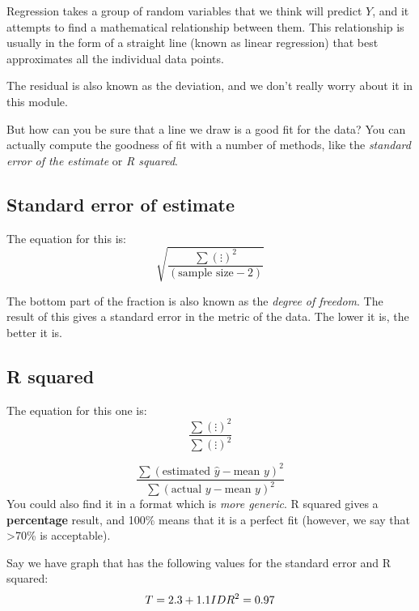 \documentclass[11pt,a4paper,titlepage]{scrartcl}
\begin{document}
Regression takes a group of random variables that we think will predict
$Y$, and it attempts to find a mathematical relationship between them.
This relationship is usually in the form of a straight line (known as
linear regression) that best approximates all the individual data points.

The residual is also known as the deviation, and we don't really worry
about it in this module.

But how can you be sure that a line we draw is a good fit for the data?
You can actually compute the goodness of fit with a number of methods,
like the \textit{standard error of the estimate} or \textit{R squared}.

\subsection{Standard error of estimate}%
\label{sub:standard-error}
The equation for this is:
\begin{equation*}
    \sqrt{\frac{\sum {(\vdots)}^2}{(\text{sample size} - 2)}}
\end{equation*}

The bottom part of the fraction is also known as the \textit{degree of
freedom}. The result of this gives a standard error in the metric of the
data. The lower it is, the better it is.

\subsection{R squared}%
\label{sub:r-squared}
The equation for this one is:
\begin{equation*}
    \frac{\sum{{(\vdots)}^2}}{\sum{{(\vdots)}^2}}
\end{equation*}

\begin{equation*}
    \frac{\sum{{(\text{estimated } \hat y - \text{mean }
    y)}^2}}{\sum{(\text{actual } y - \text{mean } y)}^2}
\end{equation*}
You could also find it in a format which is \textit{more generic}. R
squared gives a \textbf{percentage} result, and 100\% means that it is a
perfect fit (however, we say that >70\% is acceptable).

Say we have graph that has the following values for the standard error and
R squared:
\begin{equation*}
    T = 2.3 + 1.1 ID \\
    R^2 = 0.97
\end{equation*}
\end{document}
